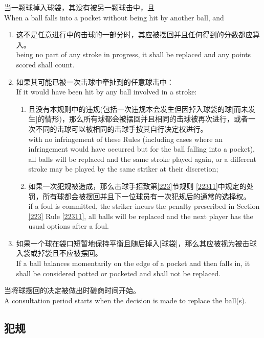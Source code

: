 \noindent 当一颗球掉入球袋，其没有被另一颗球击中，且\\
When a ball falls into a pocket without being hit by another ball, and
\begin{enumerate}[label=(\alph*)]
    \item 这不是任意进行中的击球的一部分时，其应被摆回并且任何得到的分数都应算入。\\
    being no part of any stroke in progress, it shall be replaced and any points scored shall count.
    \item 如果其可能已被一次击球中牵扯到的任意球击中：\\
    If it would have been hit by any ball involved in a stroke:
    \begin{enumerate}[label=(\roman*)]
        \item 且没有本规则中的违规(包括一次违规本会发生但因掉入球袋的球[而未发生]的情形)，那么所有球都会被摆回并且相同的击球被再次进行，或者一次不同的击球可以被相同的击球手按其自行决定权进行。\\
        with no infringement of these Rules (including cases where an infringement would have occurred but for the ball falling into a pocket), all balls will be replaced and the same stroke played again, or a different stroke may be played by the same striker at their discretion;
        \item 如果一次犯规被造成，那么击球手招致第\ref{223}节规则 \ref{22311}中规定的处罚，所有球都会被摆回并且下一位球员有一次犯规后的通常的选择权。\\
        if a foul is committed, the striker incurs the penalty prescribed in Section \ref{223} Rule \ref{22311}, all balls will be replaced and the next player has the usual options after a foul.
    \end{enumerate}
    \item 如果一个球在袋口短暂地保持平衡且随后掉入[球袋]，那么其应被视为被击球入袋或掉袋且不应被摆回。\\
    If a ball balances momentarily on the edge of a pocket and then falls in, it shall be considered potted or pocketed and shall not be replaced.
\end{enumerate}
\noindent 当将球摆回的决定被做出时磋商时间开始。\\
A consultation period starts when the decision is made to replace the ball(s).

\subsection{犯规}\label{22310}

